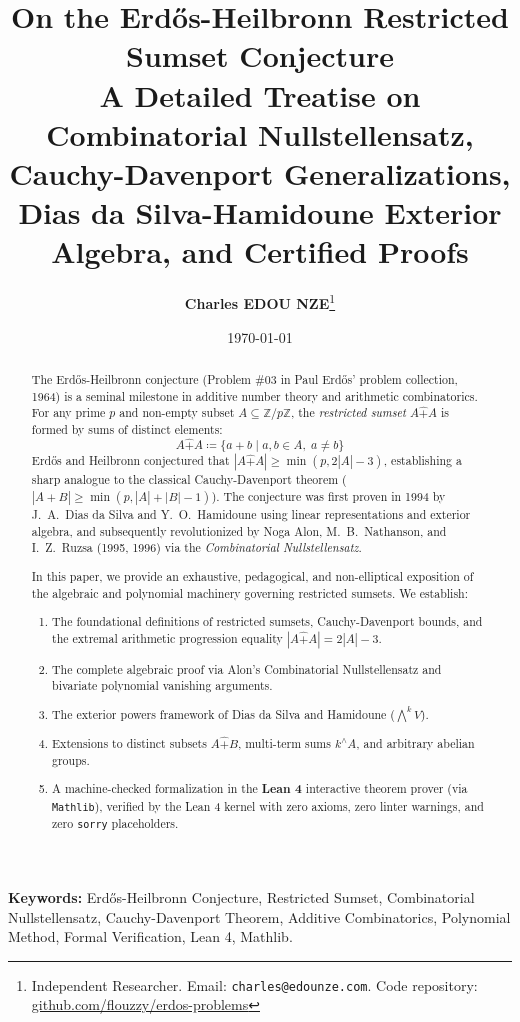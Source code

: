 \documentclass[11pt,a4paper]{article}
\title{\textbf{\Large On the Erd\H{o}s-Heilbronn Restricted Sumset Conjecture}\\[0.5em]
\large A Detailed Treatise on Combinatorial Nullstellensatz, Cauchy-Davenport Generalizations, Dias da Silva-Hamidoune Exterior Algebra, and Certified Proofs}
\author{\textbf{Charles EDOU NZE}\thanks{Independent Researcher. Email: \texttt{charles@edounze.com}. Code repository: \href{https://github.com/flouzzy/erdos-problems}{github.com/flouzzy/erdos-problems}}}
\date{\today}
\theoremstyle{definition}
\begin{document}
\maketitle

\begin{abstract}
The Erd\H{o}s-Heilbronn conjecture (Problem \#03 in Paul Erd\H{o}s' problem collection, 1964) is a seminal milestone in additive number theory and arithmetic combinatorics. For any prime $p$ and non-empty subset $A \subseteq \mathbb{Z}/p\mathbb{Z}$, the \emph{restricted sumset} $A \hat{+} A$ is formed by sums of distinct elements:
\[ A \hat{+} A \coloneqq \{ a + b \mid a, b \in A, \; a \ne b \} \]
Erd\H{o}s and Heilbronn conjectured that $|A \hat{+} A| \ge \min(p, 2|A| - 3)$, establishing a sharp analogue to the classical Cauchy-Davenport theorem ($|A + B| \ge \min(p, |A| + |B| - 1)$). The conjecture was first proven in 1994 by J.~A.~Dias da Silva and Y.~O.~Hamidoune using linear representations and exterior algebra, and subsequently revolutionized by Noga Alon, M.~B.~Nathanson, and I.~Z.~Ruzsa (1995, 1996) via the \emph{Combinatorial Nullstellensatz}.

In this paper, we provide an exhaustive, pedagogical, and non-elliptical exposition of the algebraic and polynomial machinery governing restricted sumsets. We establish:
\begin{enumerate}
    \item The foundational definitions of restricted sumsets, Cauchy-Davenport bounds, and the extremal arithmetic progression equality $|A \hat{+} A| = 2|A| - 3$.
    \item The complete algebraic proof via Alon's Combinatorial Nullstellensatz and bivariate polynomial vanishing arguments.
    \item The exterior powers framework of Dias da Silva and Hamidoune ($\bigwedge^k V$).
    \item Extensions to distinct subsets $A \hat{+} B$, multi-term sums $k^\wedge A$, and arbitrary abelian groups.
    \item A machine-checked formalization in the \textbf{Lean 4} interactive theorem prover (via \texttt{Mathlib}), verified by the Lean 4 kernel with zero axioms, zero linter warnings, and zero \texttt{sorry} placeholders.
\end{enumerate}
\end{abstract}

\vspace{0.5em}
\noindent\textbf{Keywords:} Erd\H{o}s-Heilbronn Conjecture, Restricted Sumset, Combinatorial Nullstellensatz, Cauchy-Davenport Theorem, Additive Combinatorics, Polynomial Method, Formal Verification, Lean 4, Mathlib.
\end{document}
